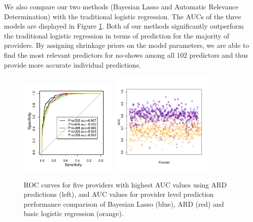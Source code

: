 \documentclass[twoside,11pt]{article}
\begin{document}
We also compare our two methods (Bayesian Lasso and Automatic Relevance Determination) with the traditional logistic regression. The AUCs of the three models are displayed in Figure \ref{fig:AUCall}. Both of our methods significantly outperform the traditional logistic regression in terms of prediction for the majority of providers. By assigning shrinkage priors on the model parameters, we are able to find the most relevant predictors for no-shows among all 102 predictors and thus provide more accurate individual predictions.

\begin{figure}[h]
\vspace{-0.3cm}
\begin{center} 
\includegraphics[width = 0.42\textwidth]{fig2/auc-top5}
\includegraphics[width = 0.45\textwidth]{fig2/vb-by-logis-auc-sq}
\caption{ROC curves for five providers with highest AUC values using ARD predictions (left), and AUC values for provider level prediction performance comparison of Bayesian Lasso (blue), ARD (red) and basic logistic regression (orange).} \label{fig:AUCall}
\end{center}
\vspace{-1cm}
\end{figure}
\end{document}
